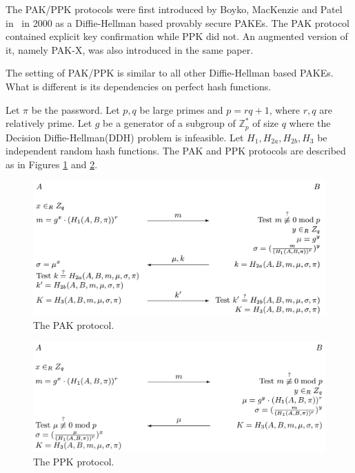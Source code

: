 

The PAK/PPK protocols were first introduced by Boyko, MacKenzie and Patel in~\cite{BoMaPa00} in 2000
as a Diffie-Hellman based provably secure PAKEs. The PAK protocol contained explicit key confirmation
while PPK did not. An augmented version of it, namely PAK-X, was also introduced in the same paper.

The setting of PAK/PPK is similar to all other Diffie-Hellman based PAKEs. What is different is its dependencies on perfect hash functions.

Let $\pi$ be the password. Let $p, q$ be large primes and $p = rq+1$, where $r, q$ are relatively prime. Let $g$ be a generator
of a subgroup of $\mathbb{Z}^\ast_p$ of size $q$ where the Decision Diffie-Hellman(DDH) problem
is infeasible. Let $H_1, H_{2a}, H_{2b}, H_3$ be independent random hash functions. The PAK and PPK
protocols are described as in Figures \ref{fig:pak} and \ref{fig:ppk}. 

\begin{figure}[h]
    \centering
    \label{fig:pak}
    \includegraphics[scale=0.4]{pak_protocol.png}
    \caption{The PAK protocol.}
\end{figure}

\begin{figure}[h]
    \centering
    \label{fig:ppk}
    \includegraphics[scale=0.33]{ppk_protocol.png}
    \caption{The PPK protocol.}
\end{figure}

